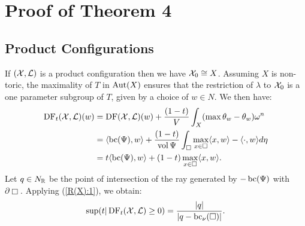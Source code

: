 \section{Proof of Theorem 4}
\subsection{Product Configurations}
If \(({\mathcal{X}},\mathcal{L})\) is a product configuration then we have \({\mathcal{X}}_0 \cong X\). Assuming \(X\) is non-toric, the maximality of \(T\) in \(\mathop{\rm Aut}\nolimits(X)\) ensures that the restriction of \(\lambda\) to \({\mathcal{X}}_0\) is a one parameter subgroup of \(T\), given by a choice of \(w \in N\).
We then have:
\begin{align*}
\mathop{\rm DF}\nolimits_t({\mathcal{X}},\mathcal{L})(w) &=   \mathop{\rm DF}\nolimits({\mathcal{X}},\mathcal{L})(w) + \frac{(1-t)}{V} \int_{X} (\max \theta_w - \theta_w) \omega^n \\ &= \langle  \mathop{\rm bc}\nolimits(\Psi), w \rangle + \frac{(1-t)}{\mathop{\rm vol}\nolimits \Psi} \int_\Box \max_{x \in \Box} \langle x,w \rangle  - \langle \cdot, w \rangle d \eta \\
&= t \langle  \mathop{\rm bc}\nolimits(\Psi), w \rangle + (1-t)\max_{x \in \Box} \langle x,w \rangle.
\end{align*}
Let \(q \in N_{\mathbb{R}}\) be the point of intersection of the ray generated by \(-\mathop{\rm bc}\nolimits(\Psi)\) with \(\partial \Box\). Applying (\ref{R(X):1}), we obtain:
\[
\sup(t | \mathop{\rm DF}\nolimits_t({\mathcal{X}},\mathcal{L}) \ge 0) = \frac{|q|}{|q-\mathop{\rm bc}\nolimits_\nu(\Box)|}.
\]

